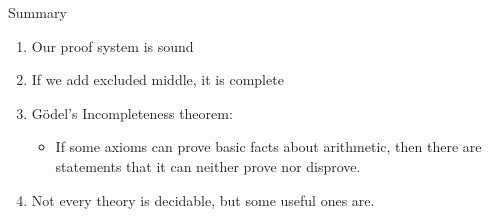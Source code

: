 \documentclass[xetex,aspectratio=169,14pt,hyperref={pdfpagelabels=true,pdflang={en-GB}}]{beamer}
\begin{document}
\begin{frame}
  {Summary}

  \begin{enumerate}
  \item Our proof system is sound
  \item If we add excluded middle, it is complete
  \item G{\"o}del's Incompleteness theorem:
    \begin{itemize}
    \item If some axioms can prove basic facts about arithmetic, then
      there are statements that it can neither prove nor disprove.
    \end{itemize}
  \item Not every theory is decidable, but some useful ones are.
  \end{enumerate}
\end{frame}
\end{document}
